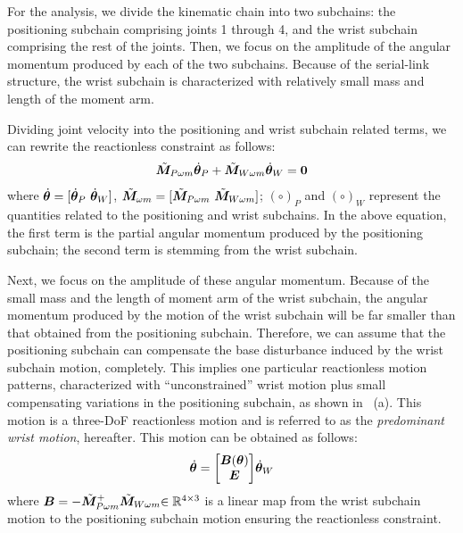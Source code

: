 For the analysis, we divide the kinematic chain into two subchains: 
the positioning subchain comprising  joints 1 through 4, and the wrist subchain 
comprising the rest of the joints. Then, we focus on the amplitude of the angular momentum 
produced by each of the two subchains. Because of the serial-link structure, the  wrist subchain is 
characterized with relatively small mass and length of the moment arm. 

Dividing joint velocity into the positioning and wrist subchain related terms,
we can rewrite the reactionless constraint as follows:
%
\begin{align}
  {\tilde{\bm{M}}}_{P\omega m}{\dot{\bm{\theta}}}_{P} + {\tilde{\bm{M}}}_{W\omega m}{\dot{\bm{\theta}}}_{W} = \bm{0}
\end{align}
%
where ${\dot{\bm{\theta}}} = [{\dot{\bm{\theta}}}_{P}~{\dot{\bm{\theta}}}_{W}]$,
${\tilde{\bm{M}}}_{\omega m} = [{\tilde{\bm{M}}}_{P\omega m}~{\tilde{\bm{M}}}_{W\omega m}]$;
$(\circ)_{P}$ and $(\circ)_{W}$ represent the quantities related to the positioning and wrist subchains.
In the above equation, the first term is the partial angular momentum produced by the positioning subchain;
the second term is stemming from the wrist subchain.

Next, we focus on the amplitude of these angular momentum.
Because of the small mass and the length of moment arm of the wrist subchain,
the angular momentum produced by the motion of the wrist subchain will be far smaller than that
obtained from the positioning subchain. Therefore, we can assume that the positioning subchain 
can compensate the base disturbance induced by the wrist subchain motion, completely.
This implies one particular reactionless motion patterns, characterized with ``unconstrained'' 
wrist motion plus small compensating variations in the positioning subchain, as shown in ~(a).
This motion is a three-DoF reactionless motion and is referred to  as
the {\sl predominant wrist motion}, hereafter.
This motion can be obtained as follows:
%
\begin{align}
  {\dot{\bm{\theta}}} = {\begin{bmatrix} \bm{B}({\bm{\theta}}) \\ \bm{E} \end{bmatrix}}{\dot{\bm{\theta}}}_{W}\label{eq:RL_POS}
\end{align}
%
where $\bm{B} = -{\tilde{\bm{M}}}_{P\omega m}^{+}{\tilde{\bm{M}}}_{W\omega m}{\in\mathbb{R}^{4 \times 3}}$
is a linear map from the wrist subchain motion to the
positioning subchain motion ensuring the reactionless constraint.


